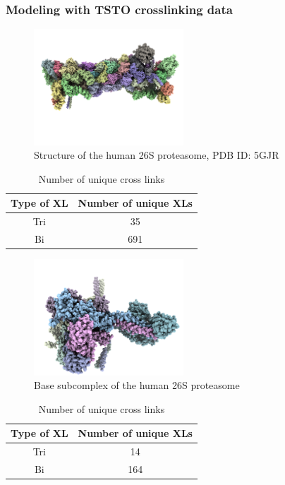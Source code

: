 \documentclass[a4paper,8pt]{beamer}
\begin{document}
\begin{frame}
  \frametitle{Modeling with TSTO crosslinking data}
  \begin{minipage}{0.48\textwidth}
    \centering
    \begin{figure}
    \centering
    \includegraphics[width=0.5\textwidth]{figures/5gjr_structure.png}
    \caption{Structure of the human 26S proteasome, PDB ID: 5GJR}
    \end{figure}
\begin{table}
    \centering
    \caption{Number of unique cross links}
    \begin{tabular}{|c|c|}
        \hline
        Type of XL & Number of unique XLs \\ \hline
        Tri & 35 \\ \hline
        Bi & 691 \\ \hline
    \end{tabular}
\end{table}
\end{minipage}
\hfill
\begin{minipage}{0.48\textwidth}
  \centering
  \begin{figure}
  \centering
  \includegraphics[width=0.5\textwidth]{figures/base_proteasome_5gjr.png}
  \caption{Base subcomplex of the human 26S proteasome}
  \end{figure}
\begin{table}
  \centering
  \caption{Number of unique cross links}
  \begin{tabular}{|c|c|}
      \hline
      Type of XL & Number of unique XLs \\ \hline
      Tri & 14 \\ \hline
      Bi & 164 \\ \hline
  \end{tabular}
\end{table}
\end{minipage}
\end{frame}
\end{document}

